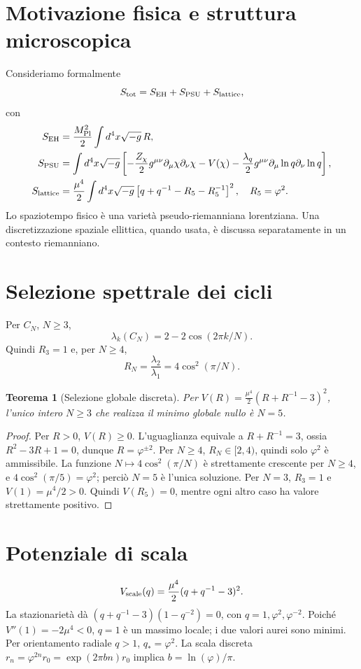 \documentclass[11pt,a4paper]{article}
\newtheorem{theorem}{Teorema}[section]\newtheorem{lemma}[theorem]{Lemma}\newtheorem{proposition}[theorem]{Proposizione}\newtheorem{corollary}[theorem]{Corollario}\newtheorem{remark}[theorem]{Osservazione}
\begin{document}
\section{Motivazione fisica e struttura microscopica}
Consideriamo formalmente
\begin{equation}\label{eq:action}S_{\rm tot}=S_{\rm EH}+S_{\rm PSU}+S_{\rm lattice},\end{equation}
con
\begin{align}S_{\rm EH}&=\frac{M_{\rm Pl}^2}{2}\int d^4x\sqrt{-g}\,R,\\
S_{\rm PSU}&=\int d^4x\sqrt{-g}\left[-\frac{Z_\chi}{2}g^{\mu\nu}\partial_\mu\chi\partial_\nu\chi-V(\chi)-\frac{\lambda_q}{2}g^{\mu\nu}\partial_\mu\ln q\partial_\nu\ln q\right],\\
S_{\rm lattice}&=\frac{\mu^4}{2}\int d^4x\sqrt{-g}\left[q+q^{-1}-R_5-R_5^{-1}\right]^2,\quad R_5=\varphi^2.\end{align}
Lo spaziotempo fisico è una varietà pseudo-riemanniana lorentziana. Una discretizzazione spaziale ellittica, quando usata, è discussa separatamente in un contesto riemanniano.
\section{Selezione spettrale dei cicli}
Per $C_N$, $N\ge3$,
\begin{equation}\lambda_k(C_N)=2-2\cos(2\pi k/N).\end{equation}
Quindi $R_3=1$ e, per $N\ge4$,
\begin{equation}\label{eq:RN}R_N=\frac{\lambda_2}{\lambda_1}=4\cos^2(\pi/N).\end{equation}
\begin{theorem}[Selezione globale discreta]\label{thm:global}Per $V(R)=\frac{\mu^4}{2}(R+R^{-1}-3)^2$, l'unico intero $N\ge3$ che realizza il minimo globale nullo è $N=5$.
\end{theorem}
\begin{proof}Per $R>0$, $V(R)\ge0$. L'uguaglianza equivale a $R+R^{-1}=3$, ossia $R^2-3R+1=0$, dunque $R=\varphi^{\pm2}$. Per $N\ge4$, $R_N\in[2,4)$, quindi solo $\varphi^2$ è ammissibile. La funzione $N\mapsto4\cos^2(\pi/N)$ è strettamente crescente per $N\ge4$, e $4\cos^2(\pi/5)=\varphi^2$; perciò $N=5$ è l'unica soluzione. Per $N=3$, $R_3=1$ e $V(1)=\mu^4/2>0$. Quindi $V(R_5)=0$, mentre ogni altro caso ha valore strettamente positivo.\end{proof}
\section{Potenziale di scala}
\begin{equation}V_{\rm scale}(q)=\frac{\mu^4}{2}(q+q^{-1}-3)^2.\end{equation}
La stazionarietà dà $(q+q^{-1}-3)(1-q^{-2})=0$, con $q=1,\varphi^2,\varphi^{-2}$. Poiché $V''(1)=-2\mu^4<0$, $q=1$ è un massimo locale; i due valori aurei sono minimi. Per orientamento radiale $q>1$, $q_*=\varphi^2$. La scala discreta $r_n=\varphi^{2n}r_0=\exp(2\pi bn)r_0$ implica $b=\ln(\varphi)/\pi$.
\end{document}
